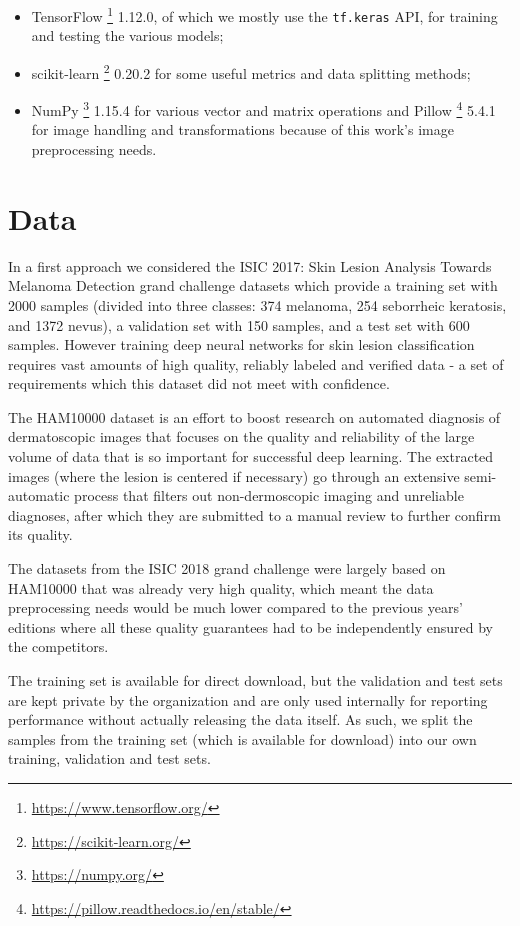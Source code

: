 \begin{itemize}
    \item TensorFlow \footnote{\url{https://www.tensorflow.org/}} 1.12.0, of which we mostly use the \verb|tf.keras| API, for training and testing the various models;
    \item scikit-learn \footnote{\url{https://scikit-learn.org/}} 0.20.2 for some useful metrics and data splitting methods;
    \item NumPy \footnote{\url{https://numpy.org/}} 1.15.4 for various vector and matrix operations and Pillow \footnote{\url{https://pillow.readthedocs.io/en/stable/}} 5.4.1 for image handling and transformations because of this work's image preprocessing needs.
\end{itemize}

\section{Data}

In a first approach we considered the ISIC 2017: Skin Lesion Analysis Towards Melanoma Detection grand challenge datasets \cite{isic2017} which provide a training set with 2000 samples (divided into three classes: 374 melanoma, 254 seborrheic keratosis, and 1372 nevus), a validation set with 150 samples, and a test set with 600 samples. However training deep neural networks for skin lesion classification requires vast amounts of high quality, reliably labeled and verified data - a set of requirements which this dataset did not meet with confidence.

The HAM10000 \cite{ham10000} dataset is an effort to boost research on automated diagnosis of dermatoscopic images that focuses on the quality and reliability of the large volume of data that is so important for successful deep learning. The extracted images (where the lesion is centered if necessary) go through an extensive semi-automatic process that filters out non-dermoscopic imaging and unreliable diagnoses, after which they are submitted to a manual review to further confirm its quality.

The datasets from the ISIC 2018 grand challenge \cite{isic2018} were largely based on HAM10000 that was already very high quality, which meant the data preprocessing needs would be much lower compared to the previous years' editions where all these quality guarantees had to be independently ensured by the competitors.

The training set is available for direct download, but the validation and test sets are kept private by the organization and are only used internally for reporting performance without actually releasing the data itself. As such, we split the samples from the training set (which is available for download) into our own training, validation and test sets.

